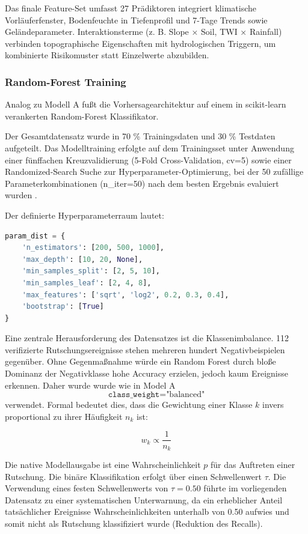 \documentclass[../main.tex]{subfiles}
\begin{document}
Das finale Feature-Set umfasst 27 Prädiktoren integriert klimatische Vorläuferfenster, Bodenfeuchte in Tiefenprofil und 7-Tage Trends sowie Geländeparameter. Interaktionsterme (z. B. Slope × Soil, TWI × Rainfall) verbinden topographische Eigenschaften mit hydrologischen Triggern, um kombinierte Risikomuster statt Einzelwerte abzubilden.



\subsubsection{Random-Forest Training}
Analog zu Modell A fußt die Vorhersagearchitektur auf einem in scikit-learn verankerten Random-Forest Klassifikator.

Der Gesamtdatensatz wurde in 70 \% Trainingsdaten und 30 \% Testdaten aufgeteilt. Das Modelltraining erfolgte auf dem Trainingsset unter Anwendung einer fünffachen Kreuzvalidierung (5-Fold Cross-Validation, cv=5) sowie einer Randomized-Search Suche zur Hyperparameter-Optimierung, bei der 50 zufällige Parameterkombinationen (n\_iter=50) nach dem besten Ergebnis evaluiert wurden \autocite{pedregosaScikitlearnMachineLearning2011}.

Der definierte Hyperparameterraum lautet:

\begin{lstlisting}[language=Python]
param_dist = {
    'n_estimators': [200, 500, 1000],
    'max_depth': [10, 20, None],
    'min_samples_split': [2, 5, 10],
    'min_samples_leaf': [2, 4, 8],
    'max_features': ['sqrt', 'log2', 0.2, 0.3, 0.4],
    'bootstrap': [True]
}
\end{lstlisting}



Eine zentrale Herausforderung des Datensatzes ist die Klassenimbalance. 112 verifizierte Rutschungsereignisse stehen mehreren hundert Negativbeispielen gegenüber. Ohne Gegenmaßnahme würde ein Random Forest durch bloße Dominanz der Negativklasse hohe Accuracy erzielen, jedoch kaum Ereignisse erkennen.
Daher wurde wurde wie in Model A
\[
    \texttt{class\_weight} = \text{"balanced"}
\]
verwendet.
Formal bedeutet dies, dass die Gewichtung einer Klasse \(k\) invers proportional zu ihrer Häufigkeit \(n_k\) ist:

\[
    w_k \propto \frac{1}{n_k}
\]







Die native Modellausgabe ist eine Wahrscheinlichkeit \( p \) für das Auftreten
einer Rutschung. Die binäre Klassifikation erfolgt über einen Schwellenwert \( \tau \).
Die Verwendung eines festen Schwellenwerts von \( \tau = 0.50 \)
führte im vorliegenden Datensatz zu einer systematischen
Unterwarnung, da ein erheblicher Anteil tatsächlicher Ereignisse
Wahrscheinlichkeiten unterhalb von 0.50 aufwies und somit nicht als
Rutschung klassifiziert wurde (Reduktion des Recalls).
\end{document}

